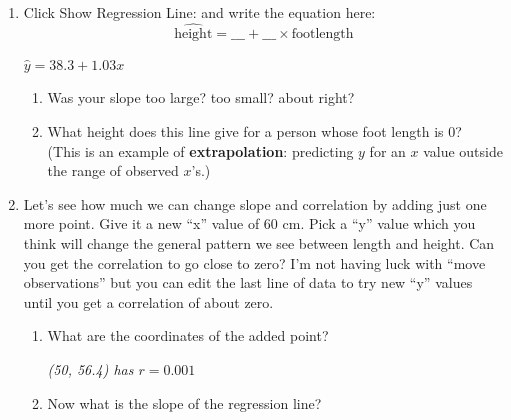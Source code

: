 \begin{enumerate}
\begin{key}
  {\it I got intercept 40.5, slope = 0.94}
\end{key}
\item Click {\sf Show Regression Line:} \fbox{$\surd$} and write the
  equation here:
  $$ \widehat{\mbox{height}} = \_\_\_ + \_\_\_ \times
  \mbox{footlength}$$
\begin{key}
  {\it $ \widehat{y} = 38.3 + 1.03 x$}
\end{key}
\begin{enumerate}
  \item Was your slope too large? too small? about right? 

  \item What height does this line give for a person whose foot length
    is 0?\vspace{.9cm}\\

    (This is an example of {\bf extrapolation}: predicting $y$ for an $x$ value
    outside the range of observed $x$'s.)
\end{enumerate}


\item  Let's see how much we can change slope and correlation by
  adding just one more point.  Give it a new ``x''  value of 60 cm.
  Pick a ``y'' value which you think will change the general pattern
  we see between length and height. Can you get the correlation to go
  close to zero?  I'm not having luck with ``move observations'' but
  you can edit the last line of data to try  new ``y'' values  until
  you get a correlation of about zero.  
  \begin{enumerate}
  \item 
  What are the coordinates of
  the added point?
\begin{students}
 \vspace{1cm}      
\end{students}

\begin{key}
  {\it (50, 56.4) has $r = 0.001$}
\end{key}
\item 
  Now what is the slope of the regression line? 
\begin{students}
 \vspace{1cm}      
\end{students}


\end{enumerate}
\end{enumerate}
